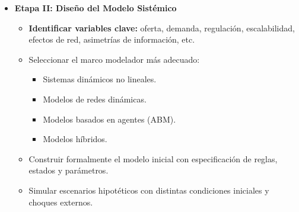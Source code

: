 \documentclass[a4paper,12pt]{article}
\begin{document}
\begin{itemize}
\begin{itemize}
\begin{itemize}
\begin{itemize}
    \item Análisis de estructura y flexibilidad: Incorporar la capacidad del monopolio para reestructurarse, diversificarse y mantener opciones abiertas frente a la incertidumbre.

    \item Evaluación de estrategias de riesgo: Analizar cómo el monopolio gestiona su exposición a eventos extremos (cisnes negros) y si su estructura le permite beneficiarse de ellos en vez de solo sobrevivir.
    \end{itemize}
\end{itemize}    

    \item Definir operacionalmente conceptos clave: monopolio, emergencia, voluntad centralizada, condiciones sistémicas, antifragilidad.
    \begin{itemize}
    \item \textbf{Referir al texto anexo sobre la implementacion del framework}
    \end{itemize}
    \item Estudiar modelos dinámicos relevantes: ecuaciones de Lotka-Volterra, redes complejas, sistemas autoorganizados.
    \begin{itemize}
    \item \textbf{Referir al texto anexo sobre la implementacion del framework}
    \end{itemize}
     
    \end{itemize}
\item \textbf{Etapa II: Diseño del Modelo Sistémico} 
	\begin{itemize}
	\item \textbf{Identificar variables clave:}
	oferta, demanda, regulación, escalabilidad, efectos
de red, asimetrías de información, etc.
    \item Seleccionar el marco modelador más adecuado:
    \begin{itemize}
        \item Sistemas dinámicos no lineales.
        \item Modelos de redes dinámicas.
        \item Modelos basados en agentes (ABM).
        \item Modelos híbridos.
    \end{itemize}
    \item Construir formalmente el modelo inicial con especificación de reglas, estados y parámetros.
    \item Simular escenarios hipotéticos con distintas condiciones iniciales y choques externos.
	\end{itemize}


\end{itemize}
\end{document}
